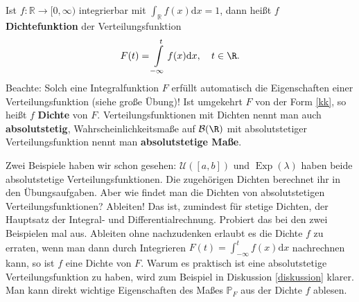 \begin{deff}\label{as}
	Ist $f \! : \mathbb{R} \rightarrow [0,\infty)$ integrierbar mit $ \int_{\mathbb{R}} f(x) \text{d}x = 1$,  dann heißt $f$ \textbf{Dichtefunktion} der Verteilungsfunktion 
	\begin{align}\label{kk}
		F(t) = \int\limits_{-\infty}^{t} f(x) \mathrm{d}x,\quad t\in\R.
	\end{align}	
	Beachte: Solch eine Integralfunktion $F$ erf\"ullt automatisch die Eigenschaften einer Verteilungsfunktion (siehe gro\ss e \"Ubung)! Ist umgekehrt $F$ von der Form \eqref{kk}, so heißt $f$ \textbf{Dichte} von $F$. Verteilungsfunktionen mit Dichten nennt man auch \textbf{absolutstetig}, Wahrscheinlichkeitsma\ss e auf $\mathcal B(\R)$ mit absolutstetiger Verteilungsfunktion nennt man \textbf{absolutstetige Ma\ss e}.
\end{deff}
Zwei Beispiele haben wir schon gesehen: $\mathcal U([a,b])$ und $\operatorname{Exp}(\lambda)$ haben beide absolutstetige Verteilungsfunktionen. Die zugeh\"origen Dichten berechnet ihr in den \"Ubungsaufgaben. Aber wie findet man die Dichten von absolutstetigen Verteilungsfunktionen? Ableiten! Das ist, zumindest f\"ur stetige Dichten, der Hauptsatz der Integral- und Differentialrechnung. Probiert das bei den zwei Beispielen mal aus. Ableiten ohne nachzudenken erlaubt es die Dichte $f$ zu erraten, wenn man dann durch Integrieren $F(t)=\int_{-\infty}^t f(x)\mathrm{d}x$ nachrechnen kann, so ist $f$ eine Dichte von $F$. Warum es praktisch ist eine absolutstetige Verteilungsfunktion zu haben, wird zum Beispiel in Diskussion \ref{diskussion} klarer. Man kann direkt wichtige Eigenschaften des Ma\ss es $\mathbb P_F$ aus der Dichte $f$ ablesen.



